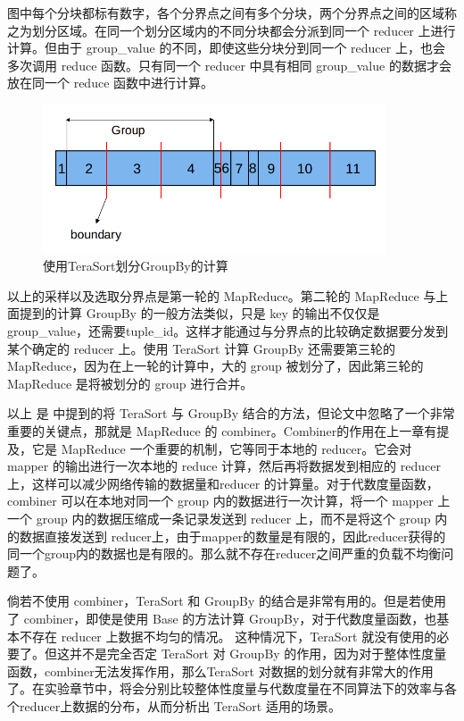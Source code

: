 图中每个分块都标有数字，各个分界点之间有多个分块，两个分界点之间的区域称之为划分区域。在同一个划分区域内的不同分块都会分派到同一个 reducer 上进行计算。但由于 group\_value 的不同，即使这些分块分到同一个 reducer 上，也会多次调用 reduce 函数。只有同一个 reducer 中具有相同 group\_value 的数据才会放在同一个 reduce 函数中进行计算。

\begin{figure}[!ht] 
\centering\includegraphics[width=4in]{picture/ch_terasort_mr/ts_groupby} 
\caption{使用TeraSort划分GroupBy的计算}\label{ts_groupby} 
\end{figure}

以上的采样以及选取分界点是第一轮的 MapReduce。第二轮的 MapReduce 与上面提到的计算 GroupBy 的一般方法类似，只是 key 的输出不仅仅是 group\_value，还需要tuple\_id。这样才能通过与分界点的比较确定数据要分发到某个确定的 reducer 上。使用 TeraSort 计算 GroupBy 还需要第三轮的 MapReduce，因为在上一轮的计算中，大的 group 被划分了，因此第三轮的 MapReduce 是将被划分的 group 进行合并。

以上 是 \cite{tao2013minimal} 中提到的将 TeraSort 与 GroupBy 结合的方法，但论文中忽略了一个非常重要的关键点，那就是 MapReduce 的 combiner。Combiner的作用在上一章有提及，它是 MapReduce 一个重要的机制，它等同于本地的 reducer。它会对 mapper 的输出进行一次本地的 reduce 计算，然后再将数据发到相应的 reducer 上，这样可以减少网络传输的数据量和reducer 的计算量。对于代数度量函数，combiner 可以在本地对同一个 group 内的数据进行一次计算，将一个 mapper 上一个 group 内的数据压缩成一条记录发送到 reducer 上，而不是将这个 group 内的数据直接发送到 reducer上，由于mapper的数量是有限的，因此reducer获得的同一个group内的数据也是有限的。那么就不存在reducer之间严重的负载不均衡问题了。

倘若不使用 combiner，TeraSort 和 GroupBy 的结合是非常有用的。但是若使用了 combiner，即使是使用 Base 的方法计算 GroupBy，对于代数度量函数，也基本不存在 reducer 上数据不均匀的情况。 这种情况下，TeraSort 就没有使用的必要了。但这并不是完全否定 TeraSort 对 GroupBy 的作用，因为对于整体性度量函数，combiner无法发挥作用，那么TeraSort 对数据的划分就有非常大的作用了。在实验章节中，将会分别比较整体性度量与代数度量在不同算法下的效率与各个reducer上数据的分布，从而分析出 TeraSort 适用的场景。

